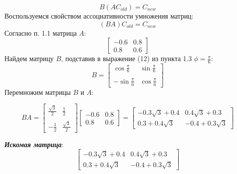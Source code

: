 \documentclass[a5paper, 10pt]{article}
\theoremstyle{definition}
\theoremstyle{plain}
\theoremstyle{remark}
\begin{document}
\begin{equation}
B(AC_{old}) = C_{new}
\end{equation}
Воспользуемся свойством ассоциативности умножения матриц:
\begin{equation}
(BA)C_{old} = C_{new}
\end{equation}
Согласно п. 1.1 матрица $A$:
\begin{equation}
\begin{bmatrix}
-0.6 & 0.8\\
0.8 & 0.6
\end{bmatrix}
\end{equation}
Найдем матрицу $B$, подставив в выражение (12) из пункта 1.3 $\phi = \frac{\pi}{6}$:
\begin{equation}
B = 
\begin{bmatrix}
\cos \frac{\pi}{6} & \sin \frac{\pi}{6} \\
\\
-\sin \frac{\pi}{6} & \cos \frac{\pi}{6}
\end{bmatrix}
\end{equation}
Перемножим матрицы $B$ и $A$:

\begin{equation}
BA =
\begin{bmatrix}
\frac{\sqrt{3}}{2} &  \frac{1}{2} \\
\\
- \frac{1}{2} & \frac{\sqrt{3}}{2}
\end{bmatrix}
\begin{bmatrix}
-0.6 & 0.8\\
0.8 & 0.6
\end{bmatrix}
=
\begin{bmatrix}
-0.3\sqrt{3} + 0.4 & 0.4\sqrt{3} + 0.3\\
0.3 + 0.4\sqrt{3} & -0.4 + 0.3\sqrt{3}
\end{bmatrix}
\end{equation}

\textit{\textbf{Искомая матрица}}:
\begin{equation}
\begin{bmatrix}
-0.3\sqrt{3} + 0.4 & 0.4\sqrt{3} + 0.3\\
0.3 + 0.4\sqrt{3} & -0.4 + 0.3\sqrt{3}
\end{bmatrix}
\end{equation}

\newpage
\end{document}
